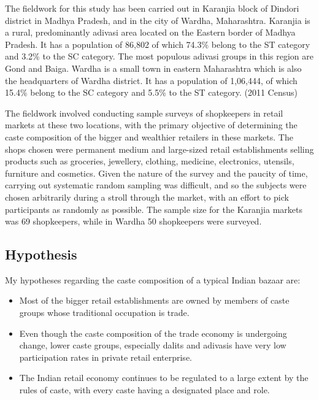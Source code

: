 \documentclass[]{article}
\begin{document}
The fieldwork for this study has been carried out in Karanjia block of
Dindori district in Madhya Pradesh, and in the city of Wardha,
Maharashtra. Karanjia is a rural, predominantly adivasi area located on
the Eastern border of Madhya Pradesh. It has a population of 86,802 of
which 74.3\% belong to the ST category and 3.2\% to the SC category. The
most populous adivasi groups in this region are Gond and Baiga. Wardha
is a small town in eastern Maharashtra which is also the headquarters of
Wardha district. It has a population of 1,06,444, of which 15.4\% belong
to the SC category and 5.5\% to the ST category. (2011 Census)

The fieldwork involved conducting sample surveys of shopkeepers in
retail markets at these two locations, with the primary objective of
determining the caste composition of the bigger and wealthier retailers
in these markets. The shops chosen were permanent medium and large-sized
retail establishments selling products such as groceries, jewellery,
clothing, medicine, electronics, utensils, furniture and cosmetics.
Given the nature of the survey and the paucity of time, carrying out
systematic random sampling was difficult, and so the subjects were
chosen arbitrarily during a stroll through the market, with an effort to
pick participants as randomly as possible. The sample size for the
Karanjia markets was 69 shopkeepers, while in Wardha 50 shopkeepers were
surveyed.

\subsection{Hypothesis}\label{hypothesis}

My hypotheses regarding the caste composition of a typical Indian bazaar
are:

\begin{itemize}
\item
  Most of the bigger retail establishments are owned by members of caste
  groups whose traditional occupation is trade.
\item
  Even though the caste composition of the trade economy is undergoing
  change, lower caste groups, especially dalits and adivasis have very
  low participation rates in private retail enterprise.
\item
  The Indian retail economy continues to be regulated to a large extent
  by the rules of caste, with every caste having a designated place and
  role.
\end{itemize}
\end{document}
